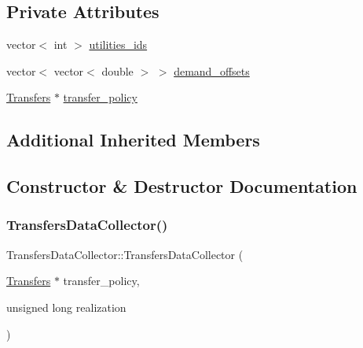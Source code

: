 \subsection*{Private Attributes}
\begin{DoxyCompactItemize}
\item 
vector$<$ int $>$ \mbox{\hyperlink{classTransfersDataCollector_ad2cee6c51c12613ac4f1bcd5e93188c6_ad2cee6c51c12613ac4f1bcd5e93188c6}{utilities\+\_\+ids}}
\item 
vector$<$ vector$<$ double $>$ $>$ \mbox{\hyperlink{classTransfersDataCollector_a9afe6069737f07aee23674c5f3073e3d_a9afe6069737f07aee23674c5f3073e3d}{demand\+\_\+offsets}}
\item 
\mbox{\hyperlink{classTransfers}{Transfers}} $\ast$ \mbox{\hyperlink{classTransfersDataCollector_a9288415ca755018fe2293e7d5913738d_a9288415ca755018fe2293e7d5913738d}{transfer\+\_\+policy}}
\end{DoxyCompactItemize}
\subsection*{Additional Inherited Members}


\subsection{Constructor \& Destructor Documentation}
\mbox{\label{classTransfersDataCollector_a757289856b49a212a16b6263bfab8b7d_a757289856b49a212a16b6263bfab8b7d}} 
\subsubsection{\texorpdfstring{Transfers\+Data\+Collector()}{TransfersDataCollector()}}
{\footnotesize\ttfamily Transfers\+Data\+Collector\+::\+Transfers\+Data\+Collector (\begin{DoxyParamCaption}\item[{\mbox{\hyperlink{classTransfers}{Transfers}} $\ast$}]{transfer\+\_\+policy,  }\item[{unsigned long}]{realization }\end{DoxyParamCaption})}



